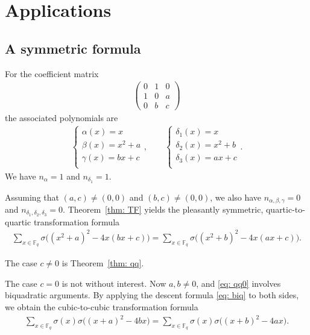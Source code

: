 \documentclass[11pt]{amsart}
\newcommand{\F}{\mathbb{F}}
\newcommand{\Fq}{\F_{\!q}}
\theoremstyle{definition}
\begin{document}
\section{Applications}\label{A}
\subsection{A symmetric formula}
For the coefficient matrix 
\begin{align*}
\begin{pmatrix}
0 & 1 & 0\\
1 & 0 & a\\
0 & b &c
\end{pmatrix}
\end{align*}
the associated polynomials are
\begin{align*}
\begin{cases}
\alpha(x)=x\\
\beta(x)=x^2+a\\
\gamma(x)=bx+c\\
\end{cases},\qquad 
\begin{cases}
\delta_1(x)=x\\
\delta_2(x)=x^2+b\\
\delta_3(x)=ax+c\\
\end{cases}.
\end{align*}
We have $n_\alpha=1$ and $n_{\delta_1}=1$. 

Assuming that $(a,c)\neq (0,0)$ and $(b,c)\neq (0,0)$, we also have $n_{\alpha,\beta,\gamma}=0$ and $n_{\delta_1,\delta_2,\delta_3}=0$. Theorem~\ref{thm: TF} yields the pleasantly symmetric, quartic-to-quartic transformation formula
\begin{align}\label{eq: qq0}
\sum_{x\in \Fq} \sigma\big((x^2+a)^2-4x(bx+c)\big)=\sum_{x\in \Fq} \sigma\big((x^2+b)^2-4x(ax+c)\big).
\end{align}


The case $c\neq 0$ is Theorem~\ref{thm: qq}.

The case $c=0$ is not without interest. Now $a,b\neq 0$, and \eqref{eq: qq0} involves biquadratic arguments. By applying the descent formula \eqref{eq: biq} to both sides, we obtain the cubic-to-cubic transformation formula
\begin{align}
\sum_{x\in \Fq} \sigma(x)\sigma\big((x+a)^2-4bx\big)=\sum_{x\in \Fq} \sigma(x)\sigma\big((x+b)^2-4ax\big).
\end{align}
\end{document}
